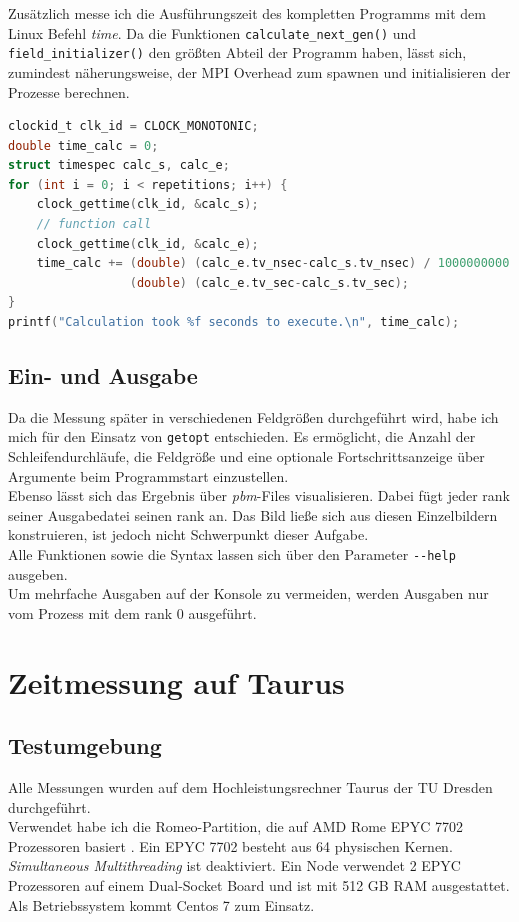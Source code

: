 \documentclass[german,plainarticle,hyperref,utf8]{zihpub}
\begin{document}
	Zusätzlich messe ich die Ausführungszeit des kompletten Programms mit dem Linux Befehl \textit{time}. Da die Funktionen \texttt{calculate\_next\_gen()} und \texttt{field\_initializer()} den größten Abteil der Programm haben, lässt sich, zumindest näherungsweise, der MPI Overhead zum spawnen und initialisieren der Prozesse berechnen.
	\clearpage
	\begin{lstlisting}[language=C, caption=Berechnung der Ausführungszeit eines \textit{function calls}]
clockid_t clk_id = CLOCK_MONOTONIC;
double time_calc = 0;
struct timespec calc_s, calc_e;
for (int i = 0; i < repetitions; i++) {
	clock_gettime(clk_id, &calc_s);
	// function call
	clock_gettime(clk_id, &calc_e);
	time_calc += (double) (calc_e.tv_nsec-calc_s.tv_nsec) / 1000000000 +
	             (double) (calc_e.tv_sec-calc_s.tv_sec);
}
printf("Calculation took %f seconds to execute.\n", time_calc);
\end{lstlisting}
	
	\subsection{Ein- und Ausgabe}
	Da die Messung später in verschiedenen Feldgrößen durchgeführt wird, habe ich mich für den Einsatz von \verb|getopt| entschieden. Es ermöglicht, die Anzahl der Schleifendurchläufe, die Feldgröße und eine optionale Fortschrittsanzeige über Argumente beim Programmstart einzustellen.\\
	Ebenso lässt sich das Ergebnis über \textit{pbm}-Files visualisieren. Dabei fügt jeder rank seiner Ausgabedatei seinen rank an. Das Bild ließe sich aus diesen Einzelbildern konstruieren, ist jedoch nicht Schwerpunkt dieser Aufgabe.\\
	Alle Funktionen sowie die Syntax lassen sich über den Parameter \texttt{-{}-help} ausgeben.\\
	
	Um mehrfache Ausgaben auf der Konsole zu vermeiden, werden Ausgaben nur vom Prozess mit dem rank 0 ausgeführt.
	\newpage
	\section{Zeitmessung auf Taurus}
	\subsection{Testumgebung} \label{umgebung}
	Alle Messungen wurden auf dem Hochleistungsrechner Taurus der TU Dresden durchgeführt.\\
	Verwendet habe ich die Romeo-Partition, die auf AMD Rome EPYC 7702 Prozessoren basiert \cite{hpc}. Ein EPYC 7702 besteht aus 64 physischen Kernen. \textit{Simultaneous Multithreading} ist deaktiviert. Ein Node verwendet 2 EPYC Prozessoren auf einem Dual-Socket Board und ist mit 512 GB RAM ausgestattet. Als Betriebssystem kommt Centos 7 zum Einsatz.\\
	
\end{document}
